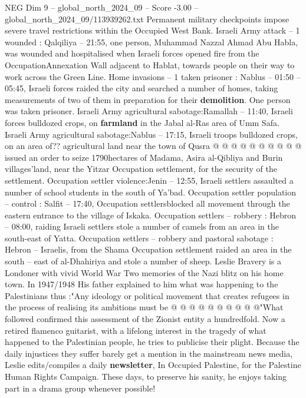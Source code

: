 \begin{textsample}{NEG Dim 9 – global\_north\_2024\_09 – Score -3.00 – global\_north\_2024\_09/113939262.txt}
Permanent military checkpoints impose severe travel restrictions within the Occupied West Bank.
Israeli Army attack -- 1 wounded : Qalqiliya -- 21:55, one person, Muhammad Nazzal Ahmad Abu Habla, was wounded and hospitalised when Israeli forces opened fire from the OccupationAnnexation Wall adjacent to Hablat, towards people on their way to work across the Green Line.
Home invasions -- 1 taken prisoner : Nablus -- 01:50 -- 05:45, Israeli forces raided the city and searched a number of homes, taking measurements of two of them in preparation for their \textbf{demolition}.
One person was taken prisoner.
Israeli Army agricultural sabotage:Ramallah -- 11:40, Israeli forces bulldozed crops, on \textbf{farmland} in the Jabal al-Ras area of Umm Safa.
Israeli Army agricultural sabotage:Nablus -- 17:15, Israeli troops bulldozed crops, on an area of?? agricultural land near the town of Qusra @ @ @ @ @ @ @ @ @ @ issued an order to seize 1790hectares of Madama, Asira al-Qibliya and Burin villages'land, near the Yitzar Occupation settlement, for the security of the settlement.
Occupation settler violence:Jenin -- 12:55, Israeli settlers assaulted a number of school students in the south of Ya'bad.
Occupation settler population -- control : Salfit -- 17:40, Occupation settlersblocked all movement through the eastern entrance to the village of Iskaka.
Occupation settlers -- robbery : Hebron -- 08:00, raiding Israeli settlers stole a number of camels from an area in the south-east of Yatta.
Occupation settlers -- robbery and pastoral sabotage : Hebron -- Israelis, from the Shama Occupation settlement raided an area in the south -- east of al-Dhahiriya and stole a number of sheep.
Leslie Bravery is a Londoner with vivid World War Two memories of the Nazi blitz on his home town.
In 1947/1948 His father explained to him what was happening to the Palestinians thus :"Any ideology or political movement that creates refugees in the process of realising its ambitions must be @ @ @ @ @ @ @ @ @ @"What followed confirmed this assessment of the Zionist entity a hundredfold.
Now a retired flamenco guitarist, with a lifelong interest in the tragedy of what happened to the Palestinian people, he tries to publicise their plight.
Because the daily injustices they suffer barely get a mention in the mainstream news media, Leslie edits/compiles a daily \textbf{newsletter}, In Occupied Palestine, for the Palestine Human Rights Campaign.
These days, to preserve his sanity, he enjoys taking part in a drama group whenever possible!

\end{textsample}
